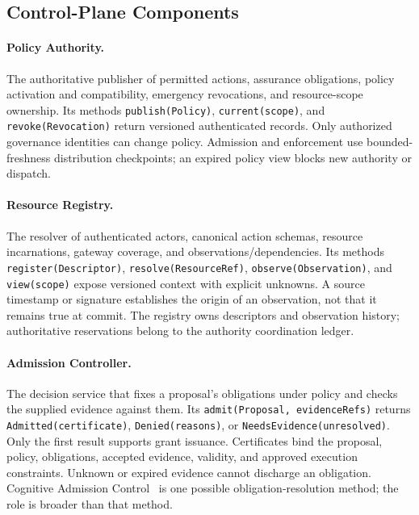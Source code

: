 \subsection{Control-Plane Components}
\paragraph{Policy Authority.}
The authoritative publisher of permitted actions, assurance obligations, policy activation and compatibility, emergency revocations, and resource-scope ownership. Its methods \texttt{publish(Policy)}, \texttt{current(scope)}, and \texttt{revoke(Revocation)} return versioned authenticated records. Only authorized governance identities can change policy. Admission and enforcement use bounded-freshness distribution checkpoints; an expired policy view blocks new authority or dispatch.

\paragraph{Resource Registry.}
The resolver of authenticated actors, canonical action schemas, resource incarnations, gateway coverage, and observations/dependencies. Its methods \texttt{register(Descriptor)}, \texttt{resolve(ResourceRef)}, \texttt{observe(Observation)}, and \texttt{view(scope)} expose versioned context with explicit unknowns. A source timestamp or signature establishes the origin of an observation, not that it remains true at commit. The registry owns descriptors and observation history; authoritative reservations belong to the authority coordination ledger.

\paragraph{Admission Controller.}
The decision service that fixes a proposal's obligations under policy and checks the supplied evidence against them. Its \texttt{admit(Proposal, evidenceRefs)} returns \texttt{Admitted(certificate)}, \texttt{Denied(reasons)}, or \texttt{NeedsEvidence(unresolved)}. Only the first result supports grant issuance. Certificates bind the proposal, policy, obligations, accepted evidence, validity, and approved execution constraints. Unknown or expired evidence cannot discharge an obligation. Cognitive Admission Control~\cite{he2026cac} is one possible obligation-resolution method; the role is broader than that method.

